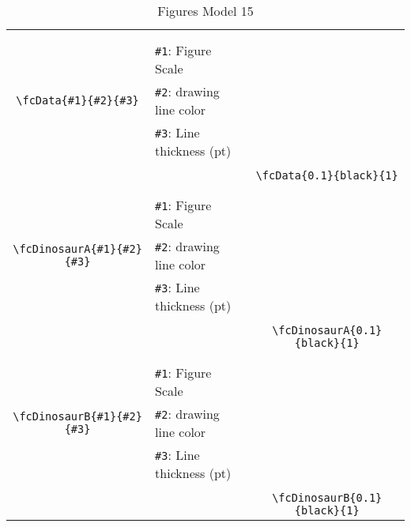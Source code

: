 \documentclass[x11names]{article}
\begin{document}
\begin{table}[H]
\begin{tabular}{|c|l|c|}
	&&\multirow{5}{*}{\fcData{0.1}{black}{1}}\\	&&\\	&\verb|#1|: Figure Scale &\\	\verb|\fcData{#1}{#2}{#3}|&	\verb|#2|: drawing line color &\\	&\verb|#3|: Line thickness (pt) &\\ &&\\&&	\verb|\fcData{0.1}{black}{1}|\\\hline 	
	&&\multirow{5}{*}{\fcDinosaurA{0.1}{black}{1}}\\	&&\\	&\verb|#1|: Figure Scale &\\	\verb|\fcDinosaurA{#1}{#2}{#3}|&	\verb|#2|: drawing line color &\\	&\verb|#3|: Line thickness (pt) &\\ &&\\&&	\verb|\fcDinosaurA{0.1}{black}{1}|\\\hline 	
	&&\multirow{5}{*}{\fcDinosaurB{0.1}{black}{1}}\\	&&\\	&\verb|#1|: Figure Scale &\\	\verb|\fcDinosaurB{#1}{#2}{#3}|&	\verb|#2|: drawing line color &\\	&\verb|#3|: Line thickness (pt) &\\ &&\\&&	\verb|\fcDinosaurB{0.1}{black}{1}|\\\hline 	\hline\end{tabular}\caption{Figures Model 15}\label{tab15}\end{table}
\end{document}
